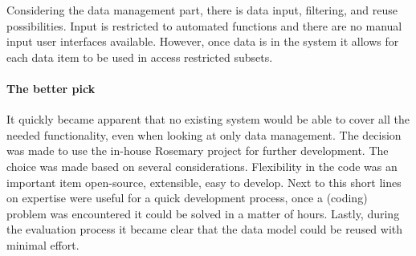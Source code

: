 Considering the data management part, there is data input, filtering, and reuse possibilities.
Input is restricted to automated functions and there are no manual input user interfaces available.
However, once data is in the system it allows for each data item to be used in access restricted subsets.

\paragraph{The better pick}
It quickly became apparent that no existing system would be able to cover all the needed functionality, even when looking at only data management.
The decision was made to use the in-house Rosemary project for further development.
The choice was made based on several considerations.
Flexibility in the code was an important item \ie{} open-source, extensible, easy to develop.
Next to this short lines on expertise were useful for a quick development process, once a (coding) problem was encountered it could be solved in a matter of hours.
Lastly, during the evaluation process it became clear that the data model could be reused with minimal effort.